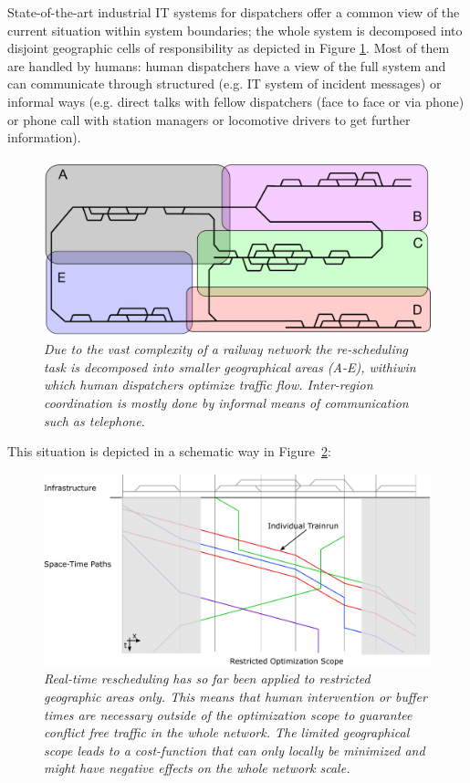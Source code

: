 \documentclass{article}
\begin{document}
State-of-the-art industrial IT systems for dispatchers offer a common view of the current situation within system boundaries; the whole system is decomposed into disjoint geographic cells of responsibility as depicted in Figure \ref{fig:geographical_decomposition}. Most of them are handled by humans: human dispatchers have a view of the full system and can communicate through structured (e.g. IT system of incident messages) or informal ways (e.g. direct talks with fellow dispatchers (face to face or via phone) or phone call with station managers or locomotive drivers to get further information).

%
\begin{figure}[hbtp]
	\centering
  \includegraphics[width=\textwidth]{Figures/disposition_areas.pdf}
	\caption{\textit{Due to the vast complexity of a railway network the re-scheduling task is decomposed into smaller geographical areas (A-E), withiwin which human dispatchers optimize traffic flow. Inter-region coordination is mostly done by informal means of communication such as telephone.} }
	\label{fig:geographical_decomposition}
\end{figure}
%

This situation is depicted in a schematic way in Figure~\ref{fig:introduction_compensation}:
%
\begin{figure}[hbtp]
	\centering
  \includegraphics[width=\textwidth]{Figures/rsp_rescheduling_heute.pdf}
	\caption{\textit{Real-time rescheduling has so far been applied to restricted geographic areas only. This means that human intervention or buffer times are necessary outside of the optimization scope to guarantee conflict free traffic in the whole network. The limited geographical scope leads to a cost-function that can only locally be minimized and might have negative effects on the whole network scale.} }
	\label{fig:introduction_compensation}
\end{figure}
%
\end{document}
